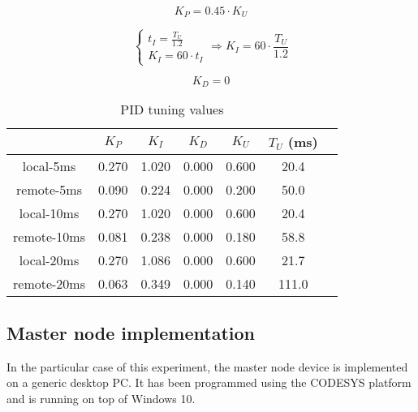 \begin{equation}
	K_P = 0.45 \cdot K_U
	\label{eq:kp}
\end{equation}

\begin{equation}
	\begin{cases}
		 t_I = \frac{T_U}{1.2} \\
		 K_I = 60 \cdot t_I
	\end{cases}
	\Rightarrow
	K_I = 60 \cdot \frac{T_U}{1.2}
	\label{eq:ki}
\end{equation}

\begin{equation}
	K_D = 0
	\label{eq:kd}
\end{equation}

\begin{table}[htp]
	\centering
	\caption{PID tuning values}
	\label{tab:pid-tunings}
	\begin{tabular}{|c|c|c|c|c|c|c|}
		\hline
		& $K_P$    & $K_I$    & $K_D$    & $K_U$    & $T_U$ (ms)                                  \\
		\hline
		local-5ms   & 0.270    & 1.020    & 0.000    & 0.600    & 20.4                                           \\
		\hline
		remote-5ms  & 0.090    & 0.224    & 0.000    & 0.200    & 50.0                                           \\
		\hline
		local-10ms  & 0.270    & 1.020    & 0.000    & 0.600    & 20.4                                           \\
		\hline
		remote-10ms & 0.081    & 0.238    & 0.000    & 0.180    & 58.8                                           \\
		\hline
		local-20ms  & 0.270    & 1.086    & 0.000    & 0.600    & 21.7                                           \\
		\hline
		remote-20ms & 0.063    & 0.349    & 0.000    & 0.140    & 
		111.0										   \\
		\hline
	\end{tabular}
\end{table}


\subsection{Master node implementation}
In the particular case of this experiment, the master node device is implemented on a generic desktop PC.
It has been programmed using the CODESYS platform and is running on top of Windows 10\texttrademark{}.

